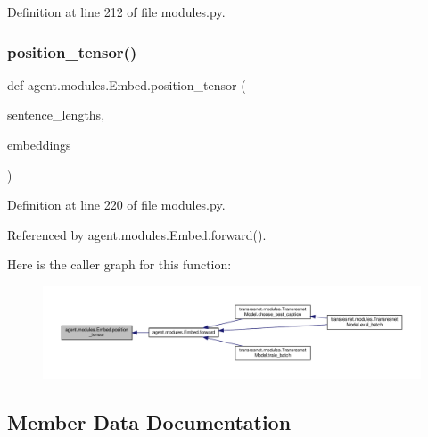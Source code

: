 Definition at line 212 of file modules.\+py.

\mbox{\label{classagent_1_1modules_1_1Embed_a4a33beb3367c08f94bac7b5076cbf96d}} 
\subsubsection{\texorpdfstring{position\+\_\+tensor()}{position\_tensor()}}
{\footnotesize\ttfamily def agent.\+modules.\+Embed.\+position\+\_\+tensor (\begin{DoxyParamCaption}\item[{}]{sentence\+\_\+lengths,  }\item[{}]{embeddings }\end{DoxyParamCaption})\hspace{0.3cm}{\ttfamily [static]}}



Definition at line 220 of file modules.\+py.



Referenced by agent.\+modules.\+Embed.\+forward().

Here is the caller graph for this function\+:
\nopagebreak
\begin{figure}[H]
\begin{center}
\leavevmode
\includegraphics[width=350pt]{classagent_1_1modules_1_1Embed_a4a33beb3367c08f94bac7b5076cbf96d_icgraph}
\end{center}
\end{figure}


\subsection{Member Data Documentation}
\mbox{\label{classagent_1_1modules_1_1Embed_ae5f6b225f9a03fbac3ff2fb91b88ca91}} 
